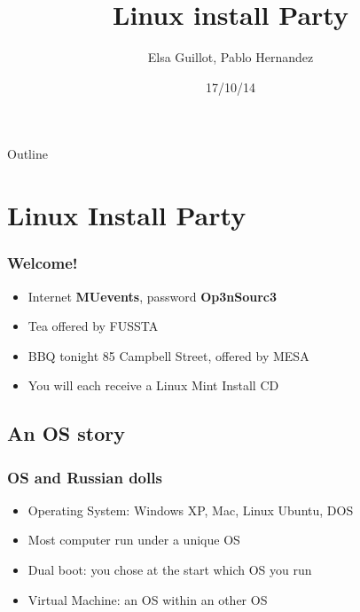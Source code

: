 \documentclass{beamer}
\title[Open Source Workshop (beamer)]{Linux install Party}
\author[Elsa, Pablo]{Elsa Guillot, Pablo Hernandez}
\institute[IFS]{IFS, Massey University}
\date{17/10/14}
\begin{document}
\begin{frame}
  \titlepage
\end{frame}

\begin{frame}{Outline}
  \tableofcontents
\end{frame}

\section{Linux Install Party}
\begin{frame}
\frametitle{Welcome!}
\begin{itemize}
\item Internet \textbf{MUevents}, password \textbf{Op3nSourc3}
\item Tea offered by FUSSTA
\item BBQ tonight 85 Campbell Street, offered by MESA
\item You will each receive a Linux Mint Install CD
\end{itemize}
\end{frame}

\subsection{An OS story}
\begin{frame}
\frametitle{OS and Russian dolls}
\begin{itemize}
  \item Operating System: Windows XP, Mac, Linux Ubuntu, DOS
  \item Most computer run under a unique OS
  \item Dual boot: you chose at the start which OS you run
  \item Virtual Machine: an OS within an other OS
\end{itemize}
\end{frame}
\end{document}
